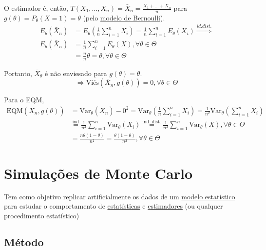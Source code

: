 \documentclass[
  letterpaper,
  DIV=11,
  numbers=noendperiod]{scrreprt}
\begin{document}
O estimador é, então,
\(T(X_{1},\dots,X_{n})=\bar{X}_{n}= \frac{X_{1}+\dots+X_{n}}{n}\) para
\(g(\theta)=P_\theta(X=1)=\theta\) (pelo
\hyperref[sec-modelobernoulli]{modelo de Bernoulli}). \[
\begin{aligned}
E_\theta(\bar{X}_{n}) &= E_\theta\left(\frac{1}{n}\sum\limits^{n}_{i=1}X_{i}\right)=
\frac{1}{n}\sum\limits^{n}_{i=1}E_\theta(X_{i}) \stackrel{id. dist.}{\Rightarrow} \\
E_\theta(\bar{X}_{n}) &= \frac{1}{n} \sum\limits^{n}_{i=1} E_\theta(X), \forall \theta \in \Theta \\
& = \frac{n}{n} \theta = \theta, \forall \theta \in \Theta
\end{aligned}
\]

Portanto, \(\bar{X}_\theta\) é não enviesado para
\(g(\theta) = \theta\). \[
\Rightarrow \mathrm{Viés}(\bar{X}_{n}, g(\theta)) = 0, \forall \theta \in \Theta
\]

Para o EQM, \[
\begin{aligned}
\mathrm{EQM}(\bar{X}_{n},g(\theta)) &= \mathrm{Var}_\theta(\bar{X}_{n}) - 0^{2} = \mathrm{Var}_\theta
\left(\frac{1}{n}\sum\limits^{n}_{i=1}X_{i}\right)= \frac{1}{n^{2}}\mathrm{Var}_\theta\left(\sum\limits^{n}_{i=1}X_{i}\right)\\
& \stackrel{\text{ind}}{=} \frac{1}{n^{2}}\sum\limits ^{n}_{i=1}\mathrm{Var}_\theta(X_{i})
\stackrel{\text{ind. dist.}}{=} \frac{1}{n^{2}} \sum\limits^{n}_{i=1}\mathrm{Var}_{\theta}(X), \forall \theta \in \Theta \\
&= \frac{n \theta(1-\theta)}{n^{2}} = \frac{\theta(1-\theta)}{n^{2}}, \forall \theta \in \Theta
\end{aligned}
\]


\chapter{Simulações de Monte
Carlo}\label{simulauxe7uxf5es-de-monte-carlo}

Tem como objetivo replicar artificialmente os dados de um
\href{modelo-estatistico.qmd}{modelo estatístico} para estudar o
comportamento de \href{estatisticas.qmd}{estatísticas} e
\href{estimadores.qmd}{estimadores} (ou qualquer procedimento
estatístico)

\section{Método}\label{muxe9todo}
\end{document}
